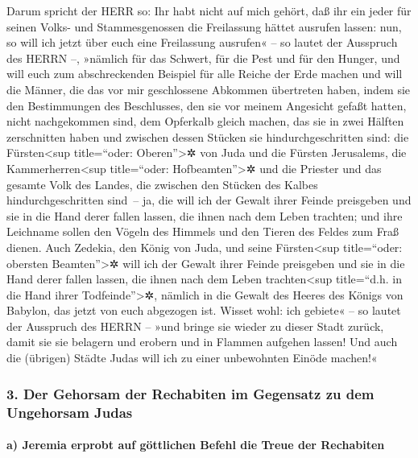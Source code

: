 Darum spricht der HERR so: Ihr habt nicht auf mich
gehört, daß ihr ein jeder für seinen Volks- und Stammesgenossen die
Freilassung hättet ausrufen lassen: nun, so will ich jetzt über euch
eine Freilassung ausrufen« -- so lautet der Ausspruch des HERRN --,
»nämlich für das Schwert, für die Pest und für den Hunger, und will euch
zum abschreckenden Beispiel für alle Reiche der Erde machen
und will die Männer, die das vor mir geschlossene
Abkommen übertreten haben, indem sie den Bestimmungen des Beschlusses,
den sie vor meinem Angesicht gefaßt hatten, nicht nachgekommen sind, dem
Opferkalb gleich machen, das sie in zwei Hälften zerschnitten haben und
zwischen dessen Stücken sie hindurchgeschritten sind: die
Fürsten\textless sup title=``oder: Oberen''\textgreater✲ von Juda und
die Fürsten Jerusalems, die Kammerherren\textless sup title=``oder:
Hofbeamten''\textgreater✲ und die Priester und das gesamte Volk des
Landes, die zwischen den Stücken des Kalbes hindurchgeschritten sind~--
ja, die will ich der Gewalt ihrer Feinde preisgeben und
sie in die Hand derer fallen lassen, die ihnen nach dem Leben trachten;
und ihre Leichname sollen den Vögeln des Himmels und den Tieren des
Feldes zum Fraß dienen. Auch Zedekia, den König von Juda,
und seine Fürsten\textless sup title=``oder: obersten
Beamten''\textgreater✲ will ich der Gewalt ihrer Feinde preisgeben und
sie in die Hand derer fallen lassen, die ihnen nach dem Leben
trachten\textless sup title=``d.h. in die Hand ihrer
Todfeinde''\textgreater✲, nämlich in die Gewalt des Heeres des Königs
von Babylon, das jetzt von euch abgezogen ist. Wisset
wohl: ich gebiete« -- so lautet der Ausspruch des HERRN -- »und bringe
sie wieder zu dieser Stadt zurück, damit sie sie belagern und erobern
und in Flammen aufgehen lassen! Und auch die (übrigen) Städte Judas will
ich zu einer unbewohnten Einöde machen!«

\hypertarget{der-gehorsam-der-rechabiten-im-gegensatz-zu-dem-ungehorsam-judas}{%
\subsubsection{3. Der Gehorsam der Rechabiten im Gegensatz zu dem
Ungehorsam
Judas}\label{der-gehorsam-der-rechabiten-im-gegensatz-zu-dem-ungehorsam-judas}}

\hypertarget{a-jeremia-erprobt-auf-guxf6ttlichen-befehl-die-treue-der-rechabiten}{%
\paragraph{a) Jeremia erprobt auf göttlichen Befehl die Treue der
Rechabiten}\label{a-jeremia-erprobt-auf-guxf6ttlichen-befehl-die-treue-der-rechabiten}}

